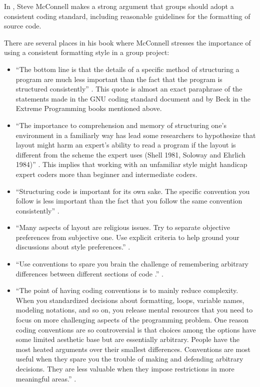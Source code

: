 In {}\cite{CodeComplete2nd04}, Steve McConnell makes a strong argument that
groups should adopt a consistent coding standard, including reasonable
guidelines for the formatting of source code.

There are several places in his book where McConnell stresses the importance
of using a consistent formatting style in a group project:

\begin{itemize}

{}\item ``The bottom line is that the details of a specific method of
structuring a program are much less important than the fact that the program
is structured consistently'' {}\cite[Section 31.1]{CodeComplete2nd04}.  This
quote is almost an exact paraphrase of the statements made in the GNU coding
standard document and by Beck in the Extreme Programming books mentioned
above.

{}\item ``The importance to comprehension and memory of structuring one's
environment in a familiarly way has lead some researchers to hypothesize that
layout might harm an expert's ability to read a program if the layout is
different from the scheme the expert uses (Shell 1981, Soloway and Ehrlich
1984)'' {}\cite[Section 31.1]{CodeComplete2nd04}.  This implies that working
with an unfamiliar style might handicap expert coders more than beginner and
intermediate coders.

{}\item ``Structuring code is important for its own sake.  The specific
convention you follow is less important than the fact that you follow the same
convention consistently'' {}\cite[Chapter 31]{CodeComplete2nd04}.

{}\item ``Many aspects of layout are religious issues.  Try to separate
objective preferences from subjective one.  Use explicit criteria to help
ground your discussions about style preferences.''  {}\cite[Chapter
31]{CodeComplete2nd04}.

{}\item ``Use conventions to spare you brain the challenge of remembering
arbitrary differences between different sections of code .''  {}\cite[Section
34.1]{CodeComplete2nd04}.

{}\item ``The point of having coding conventions is to mainly reduce
complexity.  When you standardized decisions about formatting, loops, variable
names, modeling notations, and so on, you release mental resources that you
need to focus on more challenging aspects of the programming problem.  One
reason coding conventions are so controversial is that choices among the
options have some limited aesthetic base but are essentially arbitrary.  People
have the most heated arguments over their smallest differences.  Conventions
are most useful when they spare you the trouble of making and defending
arbitrary decisions.  They are less valuable when they impose restrictions in
more meaningful areas.''  {}\cite[Section 34.1]{CodeComplete2nd04}.


\end{itemize}

